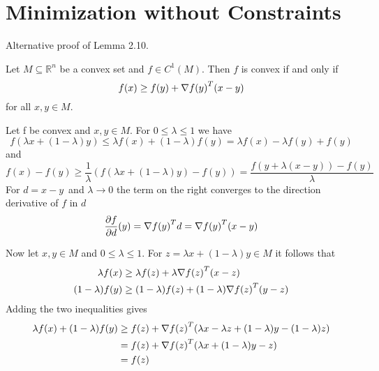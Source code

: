 
\newpage
\section{Minimization without Constraints}

Alternative proof of Lemma 2.10.

\lemma{}
Let \(M \subseteq \mathbb{R}^n\) be a convex set and \(f \in C^1(M)\). Then \(f\) is convex if and only if
\[
    f(x) \ge f(y) + \nabla {f(y)}^T (x - y)
\]
for all \(x, y \in M \). 

\proof{}
Let f be convex and \(x, y \in M\). For \( 0 \le \lambda \le 1 \) we have
\[ 
    f(\lambda x + (1 - \lambda) y) \le \lambda f(x) + (1 - \lambda)f(y) =  \lambda f(x) - \lambda f(y) + f(y) 
\] 
and 
\[ 
    f(x) - f(y) \ge \frac{1}{\lambda} (f(\lambda x + (1 - \lambda) y) - f(y)) 
        = \frac{f(y + \lambda (x - y)) - f(y)}{\lambda}
\]
For \( d = x - y \)\ and \( \lambda \to 0 \) the term on the right converges to the direction derivative of \( f \)
in \( d \)
\[
    \frac{\partial f}{\partial d}(y) = \nabla{f(y)}^T d = \nabla{f(y)}^T (x - y) 
\]

Now let \( x, y \in M \) and  \( 0 \le \lambda \le 1 \). For \( z = \lambda x + (1 - \lambda) y \in M \) it follows that
\[
    \begin{split}
    \lambda f(x) & \ge \lambda f(z) + \lambda \nabla {f(z)}^T (x - z) \\
    (1 - \lambda) f(y) & \ge (1 - \lambda) f(z) + (1 - \lambda) \nabla {f(z)}^T (y - z)
    \end{split}
\]
Adding the two inequalities gives
\[
    \begin{split}
       \lambda f(x) + (1 - \lambda) f(y) 
        & \ge f(z) + \nabla {f(z)}^T(\lambda x - \lambda z + (1- \lambda) y - (1-\lambda)z) \\
        & = f(z) + \nabla {f(z)}^T(\lambda x + (1- \lambda) y - z) \\
        & = f(z)
    \end{split}
\]

